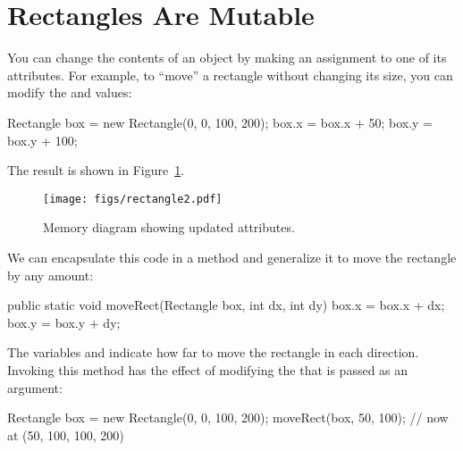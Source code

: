 
\section{Rectangles Are Mutable}
\label{mutable-objects_rectangles-are-mutable}


You can change the contents of an object by making an assignment to one of its attributes.
For example, to ``move'' a rectangle without changing its size, you can modify the  and  values:

\begin{code}
Rectangle box = new Rectangle(0, 0, 100, 200);
box.x = box.x + 50;
box.y = box.y + 100;
\end{code}

The result is shown in Figure~\ref{fig.rectangle2}.

\begin{figure}[!ht]
\begin{center}
\texttt{[image: figs/rectangle2.pdf]}
\caption{Memory diagram showing updated attributes.}
\label{fig.rectangle2}
\end{center}
\end{figure}


We can encapsulate this code in a method and generalize it to move the rectangle by any amount:

\begin{code}
public static void moveRect(Rectangle box, int dx, int dy) {
    box.x = box.x + dx;
    box.y = box.y + dy;
}
\end{code}

The variables  and  indicate how far to move the rectangle in each direction.
Invoking this method has the effect of modifying the  that is passed as an argument:

\begin{code}
Rectangle box = new Rectangle(0, 0, 100, 200);
moveRect(box, 50, 100);  // now at (50, 100, 100, 200)
\end{code}


